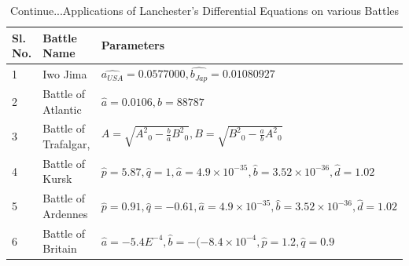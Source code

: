 \documentclass[]{article}
\begin{document}
\begin{table}
\centering
\tiny
\caption{Continue...Applications of Lanchester's Differential Equations on various Battles}

{\begin{tabular}{|p{0.1cm}|p{1.7cm}|p{5cm}|}\hline\hline
\tiny
\centering
Sl. No. & Battle Name	 & Parameters   \\
\hline
1& Iwo Jima\autocite{Rbloggers:2016}  & $\hat{a_{USA}}=0.0577000,\hat{b_{Jap}}=0.01080927 $\\
\hline
2&Battle of Atlantic\autocite{Washburn:2000}  &$\hat{a}=0.0106,\hat{b}=88787 $ \\\hline
3&Battle of Trafalgar\autocite{Kingman2002StochasticAO},\autocite{DanTeague} &  $A=\sqrt{{A^2}_0-\frac{b}{a}{B^2}_0},B=\sqrt{{B^2}_0-\frac{a}{b}{A^2}_0}$ \\\hline
4&Battle of Kursk\autocite{LukasTurkes:2004} &$\hat{p}=5.87,\hat{q}=1,\hat{a}=4.9\times10^{-35},\hat{b}=3.52\times10^{-36}, \hat{d}=1.02 $ \\\hline
5&Battle of Ardennes\autocite{Bracken:1995} &$\hat{p}=0.91,\hat{q}=-0.61,\hat{a}=4.9\times10^{-35},\hat{b}=3.52\times10^{-36}, \hat{d}=1.02 $ \\\hline
6&Battle of Britain\autocite{JohsonMackey:2011}  &$\hat{a}=-5.4E^{-4},\hat{b}=-(-8.4\times{10^{-4}},\hat{p}=1.2,\hat{q}=0.9$\\\hline
\end{tabular}}
\end{table}
\end{document}
